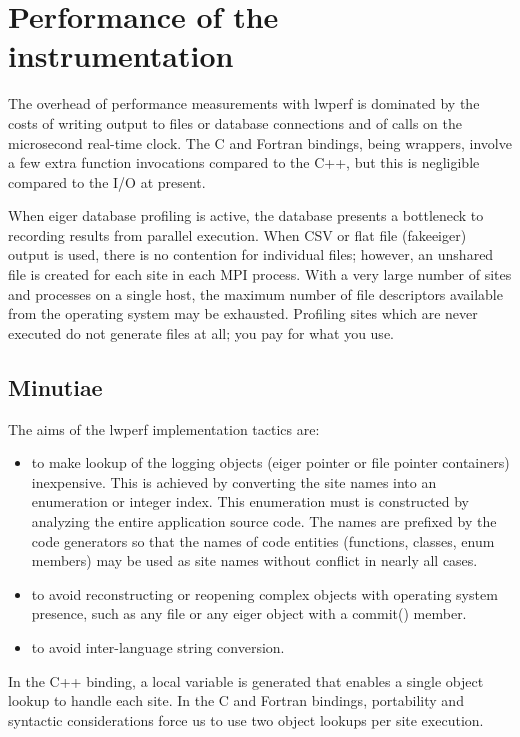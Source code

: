 \documentclass{article}
\begin{document}
\section{Performance of the instrumentation}
The overhead of performance measurements with lwperf is dominated by the costs of writing output to files or database connections and of calls on the microsecond real-time clock.
The C and Fortran bindings, being wrappers, involve a few extra function invocations compared to the C++, but this is negligible compared to the I/O at present.

When eiger database profiling is active, the database presents a bottleneck to recording results from parallel execution. When CSV or flat file (fakeeiger) output is used, there is no contention for individual files; however, an unshared file is created for each site in each MPI process. With a very large number of sites and processes on a single host, the maximum number of file descriptors available from the operating system may be exhausted. Profiling sites which are never executed do not generate files at all; you pay for what you use.

\subsection{Minutiae}
The aims of the lwperf implementation tactics are:
\begin{itemize}
\item to make lookup of the logging objects (eiger pointer or file pointer containers) inexpensive. This is achieved by converting the site names into an enumeration or integer index. This enumeration must is constructed by analyzing the entire application source code. The names are prefixed by the code generators so that the names of code entities (functions, classes, enum members) may be used as site names without conflict in nearly all cases.

\item to avoid reconstructing or reopening complex objects with operating system presence, such as any file or any eiger object with a commit() member.
\item to avoid inter-language string conversion.
\end{itemize}

In the C++ binding, a local variable is generated that enables a single object lookup to handle each site. In the C and Fortran bindings, portability and syntactic considerations force us to use two object lookups per site execution.
\end{document}
